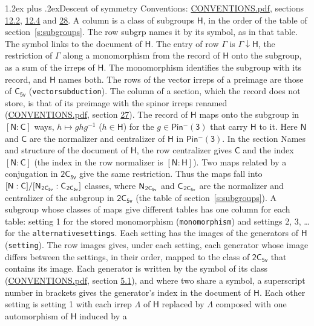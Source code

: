 \documentclass[10pt,a4paper]{article}
\makeatletter
\renewcommand\section{\@startsection{section}{1}{\z@}{-3ex plus -1ex minus -.2ex}%
  {1.2ex plus .2ex}{\normalfont\large\sffamily\bfseries\color{parttitle}}}
\numberwithin{equation}{section}
\newcommand{\grp}[1]{\mathsf{#1}}
\newcommand{\grpindex}[2]{[#1 : #2]}
\newcommand{\restr}[2]{#1\!\downarrow#2}
\newcommand{\hairsp}{\mkern1mu}
\makeatother
\begin{document}
\section{Descent of symmetry}\label{s:subduction}
Conventions: \href{../../CONVENTIONS.pdf}{CONVENTIONS.pdf}, sections \href{../../../rotation/CONVENTIONS.pdf\#conv.12.2}{12.2}, \href{../../../rotation/CONVENTIONS.pdf\#conv.12.4}{12.4} and \href{../../CONVENTIONS.pdf\#conv.28}{28}.
A column is a class of subgroups $\grp{H}$, in the order of the table of section~\ref{s:subgroups}. The row subgrp names it by its symbol, as in that table. The symbol links to the document of $\grp{H}$. The entry of row $\Gamma$ is $\restr{\Gamma}{\grp{H}}$, the restriction of $\Gamma$ along a monomorphism from the record of $\grp{H}$ onto the subgroup, as a sum of the irreps of $\grp{H}$. The monomorphism identifies the subgroup with its record, and $\grp{H}$ names both. The rows of the vector irreps of a preimage are those of \href{../../../rotation/data/pdf/C5v.pdf}{$\grp{C_{5v}}$} (\texttt{vectorsubduction}). The column of a section, which the record does not store, is that of its preimage with the spinor irreps renamed (\href{../../CONVENTIONS.pdf}{CONVENTIONS.pdf}, section \href{../../CONVENTIONS.pdf\#conv.27}{27}). \label{n:group.normalizer.o3}\label{n:group.centralizer.o3}\label{n:element.h}The record of $\grp{H}$ maps onto the subgroup in $\grpindex{\grp{N}}{\grp{C}}$ ways, $h \mapsto g h g^{-1}$ ($h \in \grp{H}$) for the $g \in \grp{Pin^{-}(3)}$ that carry $\grp{H}$ to it. Here $\grp{N}$ and $\grp{C}$ are the normalizer and centralizer of $\grp{H}$ in \href{Pinminus3.pdf}{$\grp{Pin^{-}(3)}$}. In the section Names and structure of the document of $\grp{H}$, the row centralizer gives $\grp{C}$ and the index $\grpindex{\grp{N}}{\grp{C}}$ (the index in the row normalizer is $\grpindex{\grp{N}}{\grp{H}}$). Two maps related by a conjugation in $\grp{2C_{5v}}$ give the same restriction. Thus the maps fall into $\grpindex{\grp{N}}{\grp{C}}/\grpindex{\grp{N}_{\hairsp \grp{2C_{5v}}}}{\grp{C}_{\hairsp \grp{2C_{5v}}}}$ classes, where $\grp{N}_{\hairsp \grp{2C_{5v}}}$ and $\grp{C}_{\hairsp \grp{2C_{5v}}}$ are the normalizer and centralizer of the subgroup in $\grp{2C_{5v}}$ (the table of section~\ref{s:subgroups}). \label{n:head.setting}A subgroup whose classes of maps give different tables has one column for each table: setting 1 for the stored monomorphism (\texttt{monomorphism}) and settings 2, 3, \dots{} for the \texttt{alternativesettings}. Each setting has the images of the generators of $\grp{H}$ (\texttt{setting}). \label{n:head.images}The row images gives, under each setting, each generator whose image differs between the settings, in their order, mapped to the class of $\grp{2C_{5v}}$ that contains its image. Each generator is written by the symbol of its class (\href{../../CONVENTIONS.pdf}{CONVENTIONS.pdf}, section \href{../../../rotation/CONVENTIONS.pdf\#conv.5.1}{5.1}), and where two share a symbol, a superscript number in brackets gives the generator's index in the document of $\grp{H}$. \label{n:irrep.Delta}Each other setting is setting 1 with each irrep $\Lambda$ of $\grp{H}$ replaced by $\Lambda$ composed with one automorphism of $\grp{H}$ induced by a 
\end{document}
